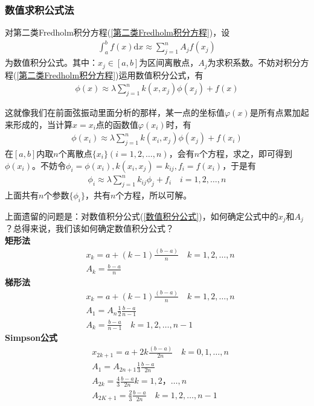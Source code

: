 		\subsubsection{数值求积公式法}
			\label{subsubsec:数值求积公式法}
			对第二类Fredholm积分方程(\ref{第二类Fredholm积分方程})，设
			\begin{align}
				\label{数值积分公式}
				\int_a^b f(x) \mathrm{d}x \approx \sum_{j = 1}^n A_j f(x_j)
			\end{align}
			为数值积分公式。其中：$x_j\in [a,b]$为区间离散点，$A_j$为求积系数。不妨对积分方程(\ref{第二类Fredholm积分方程})运用数值积分公式，有
			\begin{align*}
				\phi(x) \approx \lambda \sum_{j = 1}^n k(x,x_j) \phi(x_j) + f(x)
			\end{align*}
			\par
			这就像我们在前面弦振动里面分析的那样，某一点的坐标值$\varphi(x)$是所有点累加起来形成的，当计算$x = x_i$点的函数值$\varphi(x_i)$时，有
			\begin{align*}
				\phi(x_i) \approx \lambda \sum_{j = 1}^n k(x_i,x_j) \phi(x_j) + f(x_i)
			\end{align*}
			在$[a,b]$内取$n$个离散点$\{x_i\}(i = 1,2,\dots,n)$，会有$n$个方程，求之，即可得到$\phi(x_i)$。不妨令$\phi_i = \phi(x_i),k(x_i,x_j) = k_{ij},f_i = f(x_i)$，于是有
			\begin{align*}
				\phi_i \approx \lambda \sum_{j = 1}^n k_{ij} \phi_j + f_i \quad i = 1,2,\dots,n
			\end{align*}
			上面共有$n$个参数$\{\phi_i\}$，共有$n$个方程，所以可解。
			\par
			上面遗留的问题是：对数值积分公式(\ref{数值积分公式})，如何确定公式中的$x_j$和$A_j$？总得来说，我们该如何确定数值积分公式？\\
			\textbf{矩形法}
			\begin{align*}
				&x_k = a+(k - 1) \frac{(b-a)}{n} \quad k = 1,2,\dots,n\\
				&A_k = \frac{b-a}{n}
			\end{align*}
			\textbf{梯形法}
			\begin{align*}
				&x_k = a+(k - 1) \frac{(b-a)}{n} \quad k = 1,2,\dots,n\\
				&A_1 = A_n \frac 12\frac{b-a}{n - 1}\\
				&A_k = \frac{b-a}{n - 1} \quad k = 1,2,\dots,n-1
			\end{align*}
			\textbf{Simpson公式}
			\begin{align*}
				&x_{2k+1} = a+2k \frac{(b-a)}{2n} \quad k = 0,1,\dots,n\\
				&A_1 = A_{2n+1} \frac 13\frac{b-a}{2n}\\
				&A_{2k} = \frac{4}{3} \frac{b-a}{2n} k = 1,2，\dots,n\\
				&A_{2K+1} = \frac{2}{3} \frac{b-a}{2n}  \quad k = 1,2,\dots,n-1
			\end{align*}
